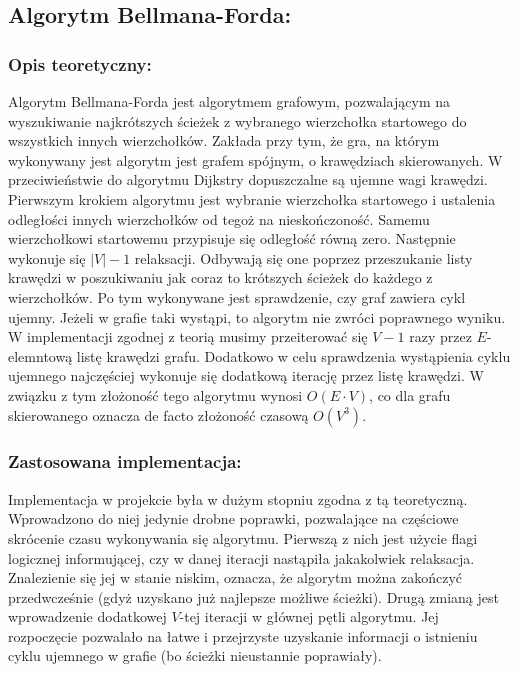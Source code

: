 \documentclass[a4paper,12pt]{article}
\begin{document}
\subsection{Algorytm Bellmana-Forda:}

\subsubsection{Opis teoretyczny:}
Algorytm Bellmana-Forda jest algorytmem grafowym, pozwalającym na wyszukiwanie najkrótszych ścieżek z wybranego wierzchołka startowego do wszystkich innych wierzchołków. Zakłada przy tym, że gra, na którym wykonywany jest algorytm jest grafem spójnym, o krawędziach skierowanych. W przeciwieństwie do algorytmu Dijkstry dopuszczalne są ujemne wagi krawędzi.\\

\noindent
Pierwszym krokiem algorytmu jest wybranie wierzchołka startowego i ustalenia odległości innych wierzchołków od tegoż na nieskończoność. Samemu wierzchołkowi startowemu przypisuje się odległość równą zero. Następnie wykonuje się $|V|-1$ relaksacji. Odbywają się one poprzez przeszukanie listy krawędzi w poszukiwaniu jak coraz to krótszych ścieżek do każdego z wierzchołków. Po tym wykonywane jest sprawdzenie, czy graf zawiera cykl ujemny. Jeżeli w grafie taki wystąpi, to algorytm nie zwróci poprawnego wyniku.\\

\noindent
W implementacji zgodnej z teorią musimy przeiterować się $V-1$ razy przez $E$-elemntową listę krawędzi grafu. Dodatkowo w celu sprawdzenia wystąpienia cyklu ujemnego najczęściej wykonuje się dodatkową iterację przez listę krawędzi. W związku z tym złożoność tego algorytmu wynosi $O(E \cdot V)$, co dla grafu skierowanego oznacza de facto złożoność czasową $O(V^3)$.

\subsubsection{Zastosowana implementacja:}
Implementacja w projekcie była w dużym stopniu zgodna z tą teoretyczną. Wprowadzono do niej jedynie drobne poprawki, pozwalające na częściowe skrócenie czasu wykonywania się algorytmu. Pierwszą z nich jest użycie flagi logicznej informującej, czy w danej iteracji nastąpiła jakakolwiek relaksacja. Znalezienie się jej w stanie niskim, oznacza, że algorytm można zakończyć przedwcześnie (gdyż uzyskano już najlepsze możliwe ścieżki). Drugą zmianą jest wprowadzenie dodatkowej $V$-tej iteracji w głównej pętli algorytmu. Jej rozpoczęcie pozwalało na łatwe i przejrzyste uzyskanie informacji o istnieniu cyklu ujemnego w grafie (bo ścieżki nieustannie poprawiały). 
\end{document}
